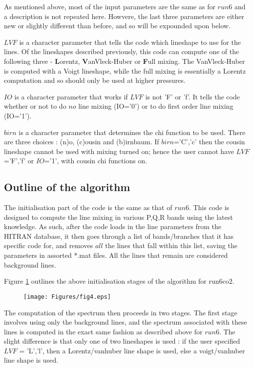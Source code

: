 \documentclass[11pt]{article}
\begin{document}
As mentioned above, most of the input parameters are the same as for $run6$
and a description is not repeated here. Howvere, the last three parameters
are either new or slightly different than before, and so will be expounded
upon below.

$LVF$ is a character parameter that tells the code which lineshape to use 
for the lines. Of the lineshapes described previously, this code can 
compute one of the following three - \textbf{L}orentz, 
\textbf{V}anVleck-Huber or 
\textbf{F}ull mixing. The VanVleck-Huber is computed with a Voigt 
lineshape, while the full mixing is essentially a Lorentz computation and so
should only be used at higher pressures.

$IO$ is a character parameter that works if $LVF$ is not 'F' or 'f'. It 
tells the code whether or not to do $no$ line mixing (IO='0') or to do 
first order line mixing (IO='1').

$birn$ is a character parameter that determines the chi function to be used.
There are three choices : (n)o, (c)ousin and (b)irnbaum. If $birn$='C','c'
then the cousin lineshape cannot be used with mixing turned on; hence the 
user cannot have $LVF$='F','f' or $IO$='1', with cousin chi functions on.

\subsection{Outline of the algorithm}
The initialisation part of the code is the same as that of $run6$. This code
is designed to compute the line mixing in various P,Q,R bands using the 
latest
knowledge. As such, after the code loads in the line parameters from the 
HITRAN database, it then goes through a list of bands/branches that it has
specific code for, and removes $all$ the lines that fall within this list,
saving the parameters in assorted *.mat files. All the lines that remain are
considered background lines.

Figure \ref{fig:init_algCO2} outlines the above initialisation stages of 
the algorithm for run6co2.

\begin{figure}[h]
  \begin{center}\texttt{[image: Figures/fig4.eps]}\end{center}
  \caption[Outline of initialization algorithm for CO2]{}
  \label{fig:init_algCO2}
\end{figure}

The computation of the spectrum then proceeds in two stages. The first 
stage 
involves using only the background lines, and the spectrum associated with 
these lines is computed in the exact same fashion as described above for 
$run6$. The slight difference is that only one of two lineshapes is used :
if the user specified $LVF$ = 'L','l', then a Lorentz/vanhuber line shape 
is used, else a voigt/vanhuber line shape is used.
\end{document}
